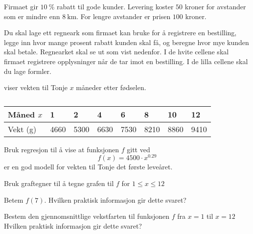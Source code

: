 Firmaet gir $\SI{10}{\percent}$ rabatt til gode kunder. Levering koster $50$
kroner for avstander som er mindre enn $\SI{8}{\km}$. For lengre avstander er
prisen $100$ kroner. \medskip

Du skal lage ett regneark som firmaet kan bruke for å registrere en bestilling,
legge inn hvor mange prosent rabatt kunden skal få, og beregne hvor mye kunden
skal betale. Regnearket skal se ut som vist nedenfor. I de hvite cellene skal
firmaet registrere opplysninger når de tar imot en bestilling. I de lilla
cellene skal du lage formler.


\Oppgave[9] %

 viser vekten til Tonje $x$ måneder etter fødselen.

\begin{table}[H]
    \caption{}
    \label{table:del-1-oppgave-2.7}
    \begin{tabularx}{\textwidth}{|l *{7}{Y}|} \hline \Rowcolor
        Måned $x$      &      1     &      2     &      4     &      6     &      8     &      10    &      12    \\ \hline
        Vekt (\si{\g}) & \num{4660} & \num{5300} & \num{6630} & \num{7530} & \num{8210} & \num{8860} & \num{9410} \\ \hline
    \end{tabularx}
\end{table}

\begin{oppgaver}
     Bruk regresjon til å vise at funksjonen $f$ gitt ved
    \begin{equation*}
        f(x) = 4500 \cdot x^{0.29}
    \end{equation*}
    er en god modell for vekten til Tonje det første leveåret.
\end{oppgaver}

\begin{oppgaver}
   Bruk graftegner til å tegne grafen til $f$ for $1 \leq x \leq 12$
\end{oppgaver}

\begin{oppgaver}
   Betem $f(7)$. Hvilken praktisk informasjon gir dette svaret?
\end{oppgaver}

\begin{oppgaver}
   Bestem den gjennomsnittlige vekstfarten til funksjonen $f$ fra $x =
    1$ til $x = 12$ Hvilken praktisk informasjon gir dette svaret?
\end{oppgaver}

